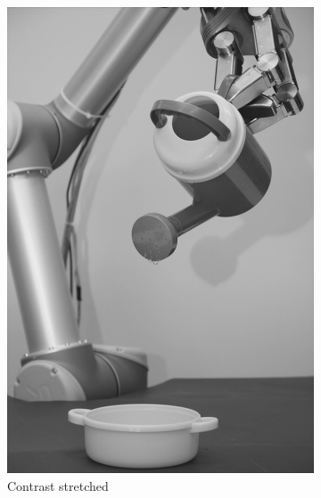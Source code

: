 \begin{figure}[H]
\begin{subfigure}[b]{0.24\textwidth}
        \includegraphics[width=\textwidth]{img4/filteredOutput_6509_contrast_strech.png}
        \caption{Contrast stretched}
        \label{fig:img2_hist}
    \end{subfigure}	
\begin{subfigure}[b]{0.24\textwidth}

\end{subfigure}
\end{figure}
